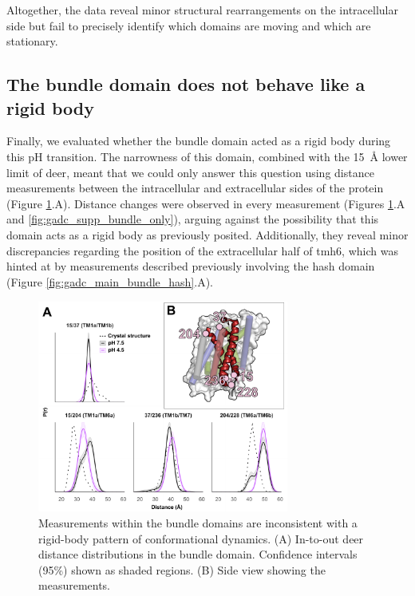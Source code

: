 Altogether, the data reveal minor structural rearrangements on the intracellular side but fail to precisely identify which domains are moving and which are stationary.

\subsection{The bundle domain does not behave like a rigid body}

Finally, we evaluated whether the bundle domain acted as a rigid body during this pH transition. The narrowness of this domain, combined with the \SI{15}{\angstrom} lower limit of \gls{deer}, meant that we could only answer this question using distance measurements between the intracellular and extracellular sides of the protein (Figure \ref{fig:gadc_main_bundle_only}.A). Distance changes were observed in every measurement (Figures \ref{fig:gadc_main_bundle_only}.A and \ref{fig:gadc_supp_bundle_only}), arguing against the possibility that this domain acts as a rigid body as previously posited. Additionally, they reveal minor discrepancies regarding the position of the extracellular half of \gls{tmh}6, which was hinted at by measurements described previously involving the hash domain (Figure \ref{fig:gadc_main_bundle_hash}.A).

\begin{figure}
\centering
\includegraphics[width=3.25in]{Figures/gadc_main_bundle_only.pdf}
 \caption[Measurements within the bundle domains are inconsistent with a rigid-body pattern of conformational dynamics. ]{Measurements within the bundle domains are inconsistent with a rigid-body pattern of conformational dynamics. (A) In-to-out \gls{deer} distance distributions in the bundle domain. Confidence intervals (95\%) shown as shaded regions. (B) Side view showing the measurements.}
\label{fig:gadc_main_bundle_only}
\end{figure}

